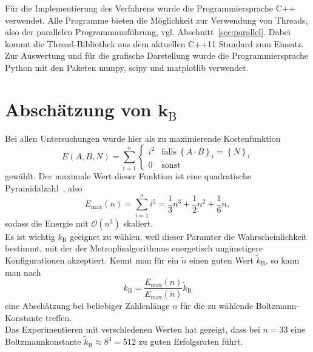 Für die Implementierung des Verfahrens wurde die Programmiersprache C++ verwendet. Alle Programme bieten die Möglichkeit zur Verwendung von Threads, also der parallelen Programmausführung, vgl. Abschnitt~\ref{sec:parallel}. Dabei kommt die Thread-Bibliothek aus dem aktuellen C++11 Standard zum Einsatz. \\
Zur Auswertung und für die grafische Darstellung wurde die Programmiersprache Python mit den Paketen numpy, scipy und matplotlib verwendet. \\ 

\section{\texorpdfstring{Abschätzung von $\bm{k_\mathrm{B}}$}{Abschätzung von kB}}\label{sec:kbguess}
Bei allen Untersuchungen wurde hier als zu maximierende Kostenfunktion
\begin{equation*}
		E\left(A,B,N\right)=\sum\limits_{i=1}^n\begin{cases}
    i^2 & \mathrm{falls}\:{\left\{A\cdot B\right\}}_i={\left\{N\right\}}_i \\
	0 & \mathrm{sonst}
  \end{cases}
\end{equation*}
gewählt. Der maximale Wert dieser Funktion ist eine quadratische Pyramidalzahl~\parencite{oeis}, also
\begin{equation*}
		E_{\mathrm{\max}}\left(n\right)=\sum\limits_{i=1}^n i^2=\frac{1}{3}n^3+\frac{1}{2}n^2+\frac{1}{6}n,\label{eq:kbguess}
\end{equation*}
sodass die Energie mit $\mathcal{O}\left(n^3\right)$ skaliert. \\
Es ist wichtig $k_\mathrm{B}$ geeignet zu wählen, weil dieser Paramter die Wahrscheinlichkeit bestimmt, mit der der Metroplisalgorithmus energetisch ungünstigere Konfigurationen akzeptiert. Kennt man für ein $\tilde{n}$ einen guten Wert $\tilde{k}_\mathrm{B}$, so kann man nach
\begin{equation*}
		k_\mathrm{B}=\frac{E_{\mathrm{\max}}\left(n\right)}{E_{\mathrm{\max}}\left(\tilde{n}\right)}\tilde{k}_\mathrm{B}
\end{equation*}
eine Abschätzung bei beliebiger Zahlenlänge $n$ für die zu wählende Boltzmann-Konstante treffen. \\
Das Experimentieren mit verschiedenen Werten hat gezeigt, dass bei $n=33$ eine Boltzmannkonstante $\tilde{k}_\mathrm{B}\approx 8^3=512$ zu guten Erfolgsraten führt. \\
